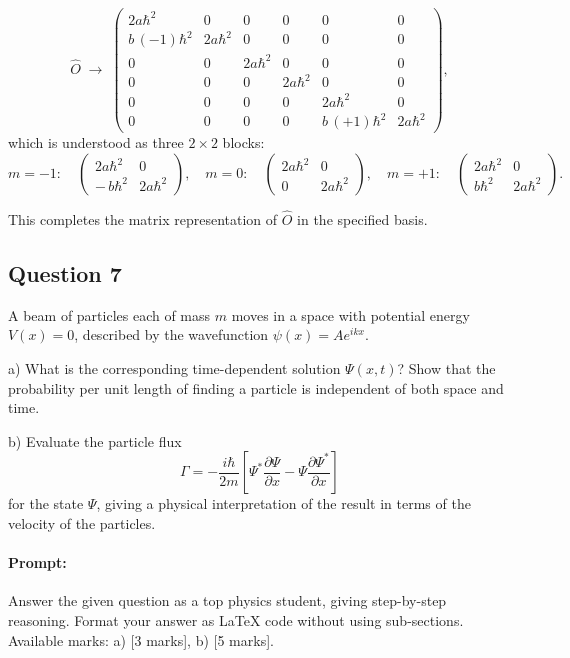 \documentclass{article}
\begin{document}
\[
\hat{O} \;\rightarrow\;
\begin{pmatrix}
2a\hbar^2 & 0            & 0           & 0            & 0           & 0 \\
b\,(-1)\hbar^2 & 2a\hbar^2 & 0           & 0            & 0           & 0 \\
0           & 0            & 2a\hbar^2 & 0            & 0           & 0 \\
0           & 0            & 0           & 2a\hbar^2 & 0           & 0 \\
0           & 0            & 0           & 0            & 2a\hbar^2 & 0 \\
0           & 0            & 0           & 0            & b\,(+1)\hbar^2 & 2a\hbar^2
\end{pmatrix},
\]
which is understood as three $2\times 2$ blocks:
\[
m=-1:\quad 
\begin{pmatrix}
2a\hbar^2 & 0\\[4pt]
-\,b\hbar^2 & 2a\hbar^2
\end{pmatrix}, 
\quad
m=0:\quad
\begin{pmatrix}
2a\hbar^2 & 0\\[4pt]
0 & 2a\hbar^2
\end{pmatrix},
\quad
m=+1:\quad
\begin{pmatrix}
2a\hbar^2 & 0\\[4pt]
b\hbar^2 & 2a\hbar^2
\end{pmatrix}.
\]

This completes the matrix representation of \(\hat{O}\) in the specified basis.

\subsection{Question 7}
A beam of particles each of mass $m$ moves in a space with potential energy $V(x) = 0$, described by the wavefunction $\psi(x) = A e^{ikx}$.  

a) What is the corresponding time-dependent solution $\Psi(x,t)$? Show that the probability per unit length of finding a particle is independent of both space and time.  

b) Evaluate the particle flux  
\[
\Gamma = -\frac{i \hbar}{2m} \left[ \Psi^* \frac{\partial \Psi}{\partial x} - \Psi \frac{\partial \Psi^*}{\partial x} \right]
\]
for the state $\Psi$, giving a physical interpretation of the result in terms of the velocity of the particles.


\paragraph{Prompt: \\} 
Answer the given question as a top physics student, giving step-by-step reasoning. Format your answer as LaTeX code without using sub-sections. Available marks: a) [3 marks], b) [5 marks].
\end{document}

